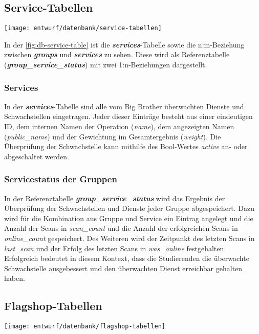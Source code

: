 \clearpage
\subsection{Service-Tabellen}
\begin{center}
	\texttt{[image: entwurf/datenbank/service-tabellen]}
	\label{fig:db-service-table}
\end{center}

In der \autoref{fig:db-service-table} ist die \textbf{\textit{services}}-Tabelle sowie die n:m-Beziehung zwischen \textbf{\textit{groups}} und \textbf{\textit{services}} zu sehen. Diese wird als Referenztabelle (\textbf{\textit{group\_service\_status}}) mit zwei 1:n-Beziehungen dargestellt.

\subsubsection{Services}
In der \textbf{\textit{services}}-Tabelle sind alle vom Big Brother überwachten Dienste und Schwachstellen eingetragen. Jeder dieser Einträge besteht aus einer eindeutigen ID, dem internen Namen der Operation (\textit{name}), dem angezeigten Namen (\textit{public\_name}) und der Gewichtung im Gesamtergebnis (\textit{weight}). Die Überprüfung der Schwachstelle kann mithilfe des Bool-Wertes \textit{active} an- oder abgeschaltet werden.

\subsubsection{Servicestatus der Gruppen}
In der Referenztabelle \textbf{\textit{group\_service\_status}} wird das Ergebnis der Überprüfung der Schwachstellen und Dienste jeder Gruppe abgespeichert. Dazu wird für die Kombination aus Gruppe und Service ein Eintrag angelegt und die Anzahl der Scans in \textit{scan\_count} und die Anzahl der erfolgreichen Scans in \textit{online\_count} gespeichert. Des Weiteren wird der Zeitpunkt des letzten Scans in \textit{last\_scan} und der Erfolg des letzten Scans in \textit{was\_online} festgehalten. Erfolgreich bedeutet in diesem Kontext, dass die Studierenden die überwachte Schwachstelle ausgebessert und den überwachten Dienst erreichbar gehalten haben.

\subsection{Flagshop-Tabellen}
\begin{center}
	\texttt{[image: entwurf/datenbank/flagshop-tabellen]}
	\label{fig:db-flagshop-table}
\end{center}

